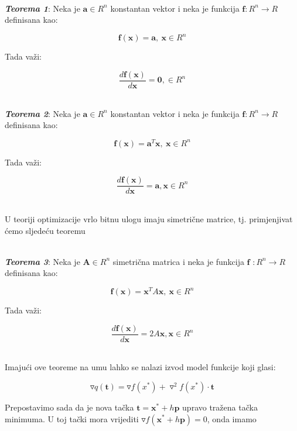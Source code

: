 \documentclass[bosnian,12pt,a4paper]{report}
\begin{document}
	
	\vspace{1cm}
	\hrulefill \\[0.4cm]
	\textbf{\textit{Teorema 1}}: Neka je $\textbf{a} \in R^n$ konstantan vektor i neka je funkcija  $\textbf{f} : R^n \rightarrow R$ definisana kao:
	
	$$\textbf{f}(\textbf{x}) = \textbf{a}, ~ \textbf{x} \in R^n$$
	
	Tada važi:
	
	$$\frac{d\textbf{f}(\textbf{x})}{d\textbf{x}} = \textbf{0}, \in R^n$$
	
	\hrulefill \\
	\vspace{0.4cm}
	\textbf{\textit{Teorema 2}}: Neka je $\textbf{a} \in R^n$ konstantan vektor i neka je funkcija  $\textbf{f} : R^n \rightarrow R$ definisana kao:
	
	$$\textbf{f}(\textbf{x}) = \textbf{a}^T \textbf{x}, ~ \textbf{x} \in R^n$$
	
	Tada važi:
	
	$$\frac{d\textbf{f}(\textbf{x})}{d\textbf{x}} = \textbf{a}, \textbf{x} \in R^n$$
	
	\vspace{1cm}
	\hrulefill \\
	
	\vspace{1cm}
	U teoriji optimizacije vrlo bitnu ulogu imaju simetrične matrice, tj. primjenjivat ćemo sljedeću teoremu 
	
	\newpage
	\hrulefill \\ 
	\textbf{\textit{Teorema 3}}: Neka je $\textbf{A} \in R^n$ simetrična matrica i neka je funkcija  $\textbf{f }: R^n \rightarrow R$ definisana kao:
	
	$$\textbf{f}(\textbf{x}) = \textbf{x}^T A\textbf{x}, ~ \textbf{x} \in R^n$$
	
	Tada važi:
	
	$$\frac{d\textbf{f}(\textbf{x})}{d\textbf{x}} = 2A\textbf{x}, \textbf{x} \in R^n$$
	
	\hrulefill \\
	
	\vspace{1cm}
	Imajući ove teoreme na umu lahko se nalazi izvod model funkcije koji glasi:
	
	$$\triangledown q(\textbf{t}) = \triangledown f(x^*) + \triangledown^2 f(x^*) \cdot \textbf{t}$$
	
	\vspace{1cm}
	Prepostavimo sada da je nova tačka  $ \textbf{t} = \textbf{x}^* + h\textbf{p}$ upravo tražena tačka minimuma. U toj tački mora vrijediti $\triangledown f(\textbf{x}^* + h\textbf{p}) = 0$, onda imamo 
	
\end{document}
